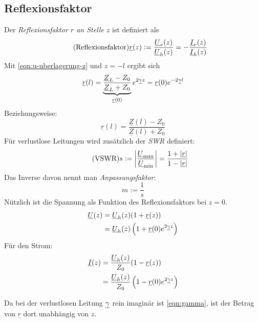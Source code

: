 \subsection{Reflexionsfaktor}
Der \emph{Reflexionsfaktor $r$ an Stelle $z$} ist definiert als
\begin{equation}
    \tag{Reflexionsfaktor}
    \underline{r}(z) := \frac{\underline{U}_r(z)}{\underline{U}_h(z)} = - \frac{\underline{I}_r(z)}{\underline{I}_h(z)}
\end{equation}
Mit \eqref{eqn:u-uberlagerung-z} und $z=-l$ ergibt sich
\begin{equation}
    \underline{r}(l) = \underbrace{\frac{\underline{Z}_L-Z_0}{\underline{Z}_L+Z_0}}_{\underline{r}(0)} e^{2\underline{\gamma} z} = \underline{r}(0) e^{-2\underline{\gamma} l}
\end{equation}
Beziehungsweise:
\begin{equation}
   \underline{r}(l) = \frac{\underline{Z}(l)-Z_0}{\underline{Z}(l)+Z_0} 
\end{equation}
\noindent
Für verlustlose Leitungen wird zusätzlich der \emph{SWR} definiert:
\begin{equation}
    \tag{VSWR}
    s := \left| \frac{\underline{U}_\text{max}}{\underline{U}_\text{min}} \right| = \frac{1+|\underline{r}|}{1-|\underline{r}|}
\end{equation}
Das Inverse davon nennt man \emph{Anpassungsfaktor}:
\begin{equation}
    \tag{Anpassungsfaktor}
    m := \frac{1}{s}
\end{equation}
Nützlich ist die Spannung als Funktion des Reflexionsfaktors bei $z=0$.
\begin{equation}
    \begin{aligned}
        \underline{U}(z) &= \underline{U}_h(z)(1+\underline{r}(z))\\
                         &= \underline{U}_h(z)\left(1+\underline{r}(0) e^{2\underline{\gamma} z}\right)
    \end{aligned}
    \label{eqn:u-r}
\end{equation}
Für den Strom:
\begin{equation}
    \begin{aligned}
        \underline{I}(z) &= \frac{\underline{U}_h(z)}{Z_0}(1-\underline{r}(z))\\
                         &= \frac{\underline{U}_h(z)}{Z_0}\left(1-\underline{r}(0) e^{2\underline{\gamma} z}\right)
    \end{aligned}
    \label{eqn:i-r}
\end{equation}

Da bei der verlustlosen Leitung $\underline{\gamma}$ rein imaginär ist \eqref{eqn:gamma}, ist der Betrag von $\underline{r}$ dort unabhängig von $z$.

